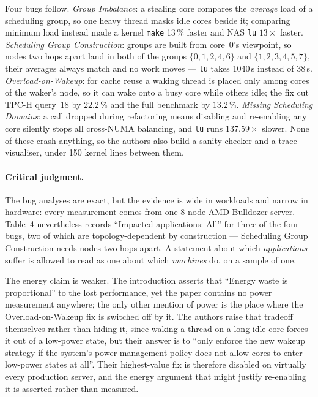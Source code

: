 Four bugs follow. \emph{Group Imbalance}: a stealing core compares the \emph{average}
load of a scheduling group, so one heavy thread masks idle cores beside it; comparing
minimum load instead made a kernel \texttt{make} 13\,\% faster and NAS \texttt{lu}
$13\times$ faster. \emph{Scheduling Group Construction}: groups are built from core~0's
viewpoint, so nodes two hops apart land in both of the groups $\{0,1,2,4,6\}$ and
$\{1,2,3,4,5,7\}$, their averages always match and no work moves --- \texttt{lu} takes
1040\,s instead of 38\,s. \emph{Overload-on-Wakeup}: for cache reuse a waking thread
is placed only among cores of the waker's node, so it can wake onto a busy core while
others idle; the fix cut TPC-H query~18 by $22.2\,\%$ and the full benchmark by
$13.2\,\%$. \emph{Missing Scheduling Domains}: a call dropped during refactoring means
disabling and re-enabling any core silently stops all cross-NUMA balancing, and
\texttt{lu} runs $137.59\times$ slower. None of these crash anything, so the authors
also build a sanity checker and a trace visualiser, under 150 kernel lines between them.

\paragraph{Critical judgment.}
The bug analyses are exact, but the evidence is wide in workloads and narrow in
hardware: every measurement comes from one 8-node AMD Bulldozer server. Table~4
nevertheless records ``Impacted applications: All'' for three of the four bugs, two of
which are topology-dependent by construction --- Scheduling Group Construction needs
nodes two hops apart. A statement about which \emph{applications} suffer is allowed to
read as one about which \emph{machines} do, on a sample of one.

The energy claim is weaker. The introduction asserts that ``Energy waste is
proportional'' to the lost performance, yet the paper contains no power measurement
anywhere; the only other mention of power is the place where the Overload-on-Wakeup fix
is switched off by it. The authors raise that tradeoff themselves rather than hiding it,
since waking a thread on a long-idle core forces it out of a low-power state, but their
answer is to ``only enforce the new wakeup strategy if the system's power management
policy does not allow cores to enter low-power states at all''. Their highest-value fix
is therefore disabled on virtually every production server, and the energy argument that
might justify re-enabling it is asserted rather than measured.

